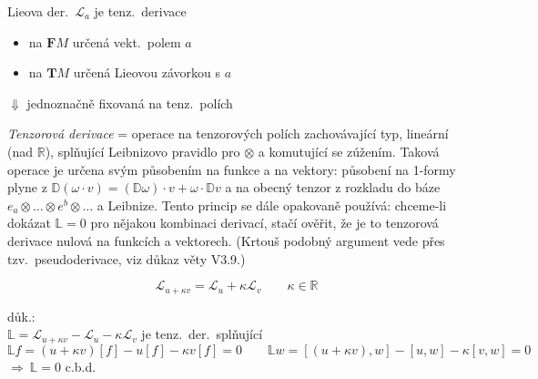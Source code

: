 \begin{veta}[Tvrzení]
Lieova der.\ $\mathcal{L}_a$ je tenz.\ derivace
\begin{itemize}[nosep]
  \item[] na $\mathbf{F}M$ určená vekt.\ polem $a$
  \item[] na $\mathbf{T}M$ určená Lieovou závorkou s $a$
\end{itemize}
$\Downarrow$ jednoznačně fixovaná na tenz.\ polích
\end{veta}

\begin{vysvetleni}
\emph{Tenzorová derivace} = operace na tenzorových polích zachovávající typ, lineární (nad $\mathbb{R}$), splňující Leibnizovo pravidlo pro $\otimes$ a komutující se zúžením. Taková operace je určena svým působením na funkce a na vektory: působení na 1-formy plyne z $\mathbb{D}(\omega\cdot v)=(\mathbb{D}\omega)\cdot v+\omega\cdot\mathbb{D}v$ a na obecný tenzor z rozkladu do báze $e_{a}\otimes\dots\otimes e^{b}\otimes\dots$ a Leibnize.
Tento princip se dále opakovaně používá: chceme-li dokázat $\mathbb{L}=0$ pro nějakou kombinaci derivací, stačí ověřit, že je to tenzorová derivace nulová na funkcích a vektorech.
(Krtouš podobný argument vede přes tzv.\ pseudoderivace, viz důkaz věty V3.9.)
\end{vysvetleni}

\begin{veta}
\[
  \mathcal{L}_{u+\kappa v} = \mathcal{L}_u + \kappa\mathcal{L}_v \qquad \kappa\in\mathbb{R}
\]
\end{veta}
důk.: \\
\quad $\mathbb{L} = \mathcal{L}_{u+\kappa v} - \mathcal{L}_u - \kappa\mathcal{L}_v$ \quad je tenz.\ der.\ splňující
\[
  \mathbb{L}f = (u+\kappa v)[f] - u[f] - \kappa v[f] = 0 \qquad
  \mathbb{L}w = [(u+\kappa v),w] - [u,w] - \kappa[v,w] = 0
\]
\quad $\Rightarrow\ \mathbb{L} = 0$ \quad c.b.d.

